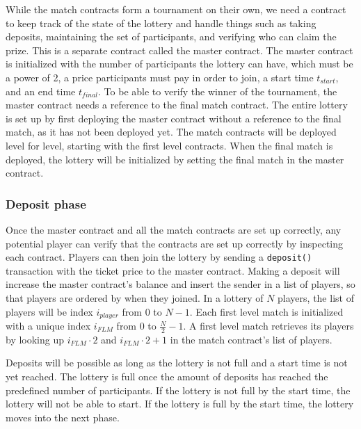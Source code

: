 While the match contracts form a tournament on their own, we need a contract to keep track of the state of the lottery and handle things such as taking deposits, maintaining the set of participants, and verifying who can claim the prize. This is a separate contract called the master contract. The master contract is initialized with the number of participants the lottery can have, which must be a power of 2, a price participants must pay in order to join, a start time $t_{start}$, and an end time $t_{final}$. To be able to verify the winner of the tournament, the master contract needs a reference to the final match contract. The entire lottery is set up by first deploying the master contract without a reference to the final match, as it has not been deployed yet. The match contracts will be deployed level for level, starting with the first level contracts. When the final match is deployed, the lottery will be initialized by setting the final match in the master contract. 


\subsubsection{Deposit phase}
Once the master contract and all the match contracts are set up correctly, any potential player can verify that the contracts are set up correctly by inspecting each contract. Players can then join the lottery by sending a \texttt{deposit()} transaction with the ticket price to the master contract. Making a deposit will increase the master contract's balance and insert the sender in a list of players, so that players are ordered by when they joined. In a lottery of $N$ players, the list of players will be index $i_{player}$ from $0$ to $N-1$. Each first level match is initialized with a unique index $i_{FLM}$ from $0$ to $\frac{N}{2}-1$. A first level match retrieves its players by looking up $i_{FLM} \cdot 2$ and $i_{FLM} \cdot 2 + 1$ in the match contract's list of players.

Deposits will be possible as long as the lottery is not full and a start time is not yet reached. The lottery is full once the amount of deposits has reached the predefined number of participants. If the lottery is not full by the start time, the lottery will not be able to start. If the lottery is full by the start time, the lottery moves into the next phase.

